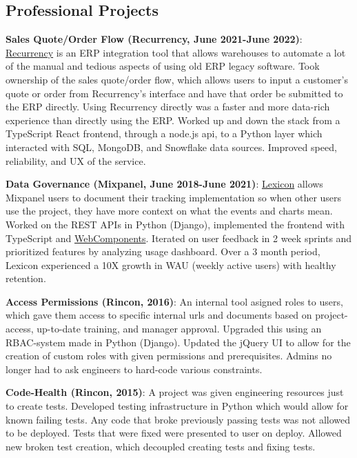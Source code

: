 \documentclass{res}
\begin{document}
\begin{resume}
\section{Professional Projects}
  {\bf Sales Quote/Order Flow (Recurrency, June 2021-June 2022)}:
  \href{https://www.recurrency.com/}{Recurrency} is an ERP integration tool that allows warehouses to automate
  a lot of the manual and tedious aspects of using old ERP legacy software. Took ownership of the sales quote/order
  flow, which allows users to input a customer's quote or order from Recurrency's interface and have that order be submitted
  to the ERP directly. Using Recurrency directly was a faster and more data-rich experience than directly using the ERP.
  Worked up and down the stack from a TypeScript React frontend, through a node.js api, to a Python layer which interacted with
  SQL, MongoDB, and Snowflake data sources. Improved speed, reliability, and UX of the service.

  {\bf Data Governance (Mixpanel, June 2018-June 2021)}:
  \href{https://help.mixpanel.com/hc/en-us/articles/360001307806-Lexicon-Overview}{Lexicon} allows Mixpanel 
  users to document their tracking implementation so when other users use the project, they have more
  context on what the events and charts mean. Worked on the REST APIs in Python (Django), implemented the
  frontend with TypeScript and \href{https://github.com/mixpanel/panel}{WebComponents}. Iterated on user
  feedback in 2 week sprints and prioritized features by analyzing usage dashboard. Over a 3 month period,
  Lexicon experienced a 10X growth in WAU (weekly active users) with healthy retention.

  {\bf Access Permissions (Rincon, 2016)}: An internal tool asigned roles to users, which gave them access
  to specific internal urls and documents based on project-access, up-to-date training, and manager approval.
  Upgraded this using an RBAC-system made in Python (Django). Updated the jQuery UI to allow for the creation
  of custom roles with given permissions and prerequisites. Admins no longer had to ask engineers to hard-code
  various constraints.

  {\bf Code-Health (Rincon, 2015)}: A project was given engineering resources just to create tests.
  Developed testing infrastructure in Python which would allow for known failing tests. Any code
  that broke previously passing tests was not allowed to be deployed. Tests that were fixed were
  presented to user on deploy. Allowed new broken test creation, which decoupled creating tests and fixing tests.


\end{resume}
\end{document}
